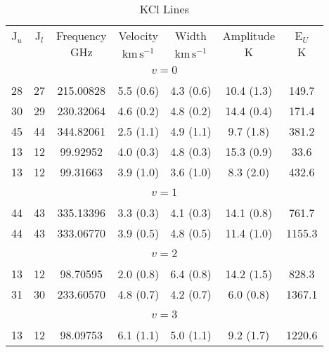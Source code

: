 \begin{table*}[htp]
\centering
\caption{KCl Lines}
\begin{tabular}{ccccccc}
\label{tab:KCl_salt_lines}
 J$_u$ & J$_l$ & Frequency & Velocity & Width & Amplitude & E$_U$ \\
  &  & $\mathrm{GHz}$ & $\mathrm{km\,s^{-1}}$ & $\mathrm{km\,s^{-1}}$ & $\mathrm{K}$ & $\mathrm{K}$ \\
\hline
&\vspace{-0.75em}\\
\multicolumn{7}{c}{$v = 0$} \\
\vspace{-0.75em}\\
 28 & 27 & 215.00828 & 5.5 (0.6) & 4.3 (0.6) & 10.4 (1.3) & 149.7 \\
 30 & 29 & 230.32064 & 4.6 (0.2) & 4.8 (0.2) & 14.4 (0.4) & 171.4 \\
 45 & 44 & 344.82061 & 2.5 (1.1) & 4.9 (1.1) & 9.7 (1.8) & 381.2 \\
 13 & 12 & 99.92952 & 4.0 (0.3) & 4.8 (0.3) & 15.3 (0.9) & 33.6 \\
 13 & 12 & 99.31663 & 3.9 (1.0) & 3.6 (1.0) & 8.3 (2.0) & 432.6 \\
&\vspace{-0.75em}\\
\multicolumn{7}{c}{$v = 1$} \\
\vspace{-0.75em}\\
 44 & 43 & 335.13396 & 3.3 (0.3) & 4.1 (0.3) & 14.1 (0.8) & 761.7 \\
 44 & 43 & 333.06770 & 3.9 (0.5) & 4.8 (0.5) & 11.4 (1.0) & 1155.3 \\
&\vspace{-0.75em}\\
\multicolumn{7}{c}{$v = 2$} \\
\vspace{-0.75em}\\
 13 & 12 & 98.70595 & 2.0 (0.8) & 6.4 (0.8) & 14.2 (1.5) & 828.3 \\
 31 & 30 & 233.60570 & 4.8 (0.7) & 4.2 (0.7) & 6.0 (0.8) & 1367.1 \\
&\vspace{-0.75em}\\
\multicolumn{7}{c}{$v = 3$} \\
\vspace{-0.75em}\\
 13 & 12 & 98.09753 & 6.1 (1.1) & 5.0 (1.1) & 9.2 (1.7) & 1220.6 \\

\end{tabular}
\end{table*}
